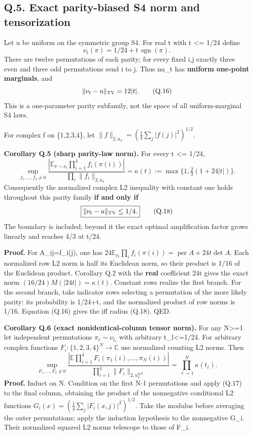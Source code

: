 \documentclass[
  11pt,
]{article}
\begin{document}
\subsection{Q.5. Exact parity-biased S4 norm and
tensorization}\label{q.5.-exact-parity-biased-s4-norm-and-tensorization}

Let u be uniform on the symmetric group S4. For real t with
\textbar t\textbar{} \textless= 1/24 define \[
\nu_t(\pi)=1/24+t\,\operatorname{sgn}(\pi).\tag{Q.15}
\] There are twelve permutations of each parity; for every fixed i,j
exactly three even and three odd permutations send i to j. Thus nu\_t
has \textbf{uniform one-point marginals}, and \[
\|\nu_t-u\|_{\rm TV}=12|t|.\tag{Q.16}
\] This is a one-parameter parity subfamily, not the space of all
uniform-marginal S4 laws.

For complex f on \{1,2,3,4\}, let
\(\|f\|_{2,u_4}=(\frac14\sum_j|f(j)|^2)^{1/2}\).

\textbf{Corollary Q.5 (sharp parity-law norm).} For every
\textbar t\textbar{} \textless= 1/24, \[
\boxed{
\sup_{f_1,\dots,f_4\ne0}
\frac{\left|\mathbb E_{\pi\sim\nu_t}\prod_{i=1}^4 f_i(\pi(i))\right|}
{\prod_i\|f_i\|_{2,u_4}}
=\kappa(t):=\max\{1,\tfrac23(1+24|t|)\}.
}\tag{Q.17}
\] Consequently the normalized complex L2 inequality with constant one
holds throughout this parity family \textbf{if and only if} \[
\boxed{\|\nu_t-u\|_{\rm TV}\le1/4.}\tag{Q.18}
\] The boundary is included; beyond it the exact optimal amplification
factor grows linearly and reaches 4/3 at \textbar t/24.

\textbf{Proof.} For A\_ij=f\_i(j), one has
\(24\mathbb E_{\nu_t}\prod_i f_i(\pi(i))=\operatorname{per}A+24t\det A\).
Each normalized row L2 norm is half its Euclidean norm, so their product
is 1/16 of the Euclidean product. Corollary Q.2 with the \textbf{real}
coefficient 24t gives the exact norm \((16/24)M(|24t|)=\kappa(t)\).
Constant rows realize the first branch. For the second branch, take
indicator rows selecting a permutation of the more likely parity: its
probability is 1/24+\textbar t\textbar, and the normalized product of
row norms is 1/16. Equation (Q.16) gives the iff radius (Q.18). QED.

\textbf{Corollary Q.6 (exact nonidentical-column tensor norm).} For any
N\textgreater=1 let independent permutations
\(\pi_\ell\sim\nu_{t_\ell}\) with arbitrary
\textbar t\_l\textbar\textless=1/24. For arbitrary complex functions
\(F_i:\{1,2,3,4\}^N\to\mathbb C\) use normalized counting L2 norms. Then
\[
\boxed{
\sup_{F_1,\dots,F_4\ne0}
\frac{\left|\mathbb E\prod_{i=1}^4
F_i(\pi_1(i),\dots,\pi_N(i))\right|}
{\prod_{i=1}^4\|F_i\|_{2,u_4^{\otimes N}}}
=\prod_{\ell=1}^N\kappa(t_\ell).
}\tag{Q.19}
\] \textbf{Proof.} Induct on N. Condition on the first N-1 permutations
and apply (Q.17) to the final column, obtaining the product of the
nonnegative conditional L2 functions
\(G_i(x)=(\frac14\sum_j|F_i(x,j)|^2)^{1/2}\). Take the modulus before
averaging the outer permutations; apply the induction hypothesis to the
nonnegative G\_i. Their normalized squared L2 norms telescope to those
of F\_i.
\end{document}

